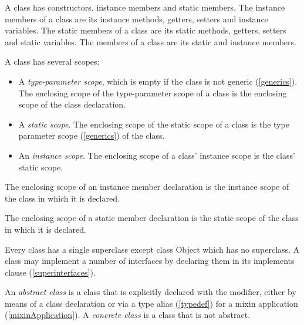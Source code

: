 \documentclass{article}
\newcommand{\code}[1]{{\sf #1}}
\begin{document}
\LMHash{}
A class has constructors,  instance members and static members. The instance members of a class are its instance methods, getters, setters and instance variables. The static members of a class are its static methods, getters, setters and static variables. The members of a class are its static and instance members.

\LMHash{}
A class has several scopes:
\begin{itemize}
\item A {\em type-parameter scope}, which is empty if the class is not generic (\ref{generics}).  The enclosing scope of the type-parameter scope of a class is the enclosing scope of the class declaration.
\item A {\em static scope}. The enclosing scope of the static scope of a  class is the type parameter scope (\ref{generics}) of the class.
\item  An {\em instance scope}.
The enclosing scope of a class' instance scope is the class' static scope.
\end{itemize}

\LMHash{}
The enclosing scope of an instance member declaration is the instance scope of the class in which it is declared.

\LMHash{}
The enclosing scope of a static member declaration is the static scope of the class in which it is declared.


\LMHash{}
Every class has a single superclass  except class \code{Object} which has no superclass. A class may implement a number of interfaces
by declaring them in its implements clause  (\ref{superinterfaces}).


\LMHash{}
An {\em abstract class} is
a class that is explicitly declared with the  \ABSTRACT{}  modifier, either by means of a class declaration or via a type alias (\ref{typedef}) for a mixin application (\ref{mixinApplication}). A {\em concrete class} is a class that is not abstract.

\end{document}
